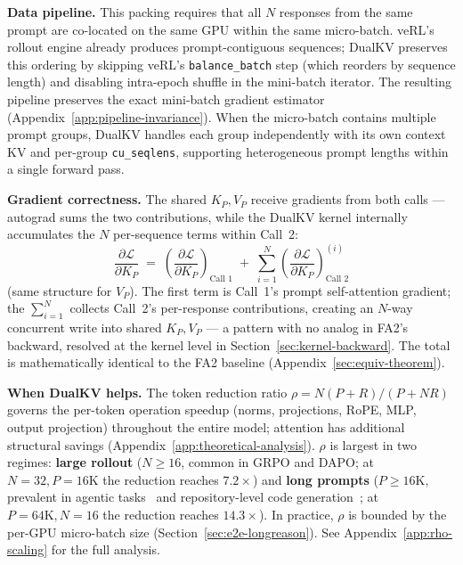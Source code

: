 \documentclass{article}
\begin{document}
\textbf{Data pipeline.} This packing requires that all $N$ responses from the same prompt are co-located on the same GPU within the same micro-batch. veRL's rollout engine already produces prompt-contiguous sequences; DualKV preserves this ordering by skipping veRL's \texttt{balance\_batch} step (which reorders by sequence length) and disabling intra-epoch shuffle in the mini-batch iterator. The resulting pipeline preserves the exact mini-batch gradient estimator (Appendix~\ref{app:pipeline-invariance}). When the micro-batch contains multiple prompt groups, DualKV handles each group independently with its own context KV and per-group \texttt{cu\_seqlens}, supporting heterogeneous prompt lengths within a single forward pass.

\textbf{Gradient correctness.} The shared $K_P, V_P$ receive gradients from both calls --- autograd sums the two contributions, while the DualKV kernel internally accumulates the $N$ per-sequence terms within Call~2:
\begin{equation}
  \frac{\partial \mathcal{L}}{\partial K_P} \;=\; \left(\frac{\partial \mathcal{L}}{\partial K_P}\right)_{\!\text{Call 1}} \;+\; \sum_{i=1}^{N} \left(\frac{\partial \mathcal{L}}{\partial K_P}\right)^{(i)}_{\!\text{Call 2}}
  \label{eq:dkp-accumulation}
\end{equation}
(same structure for $V_P$). The first term is Call~1's prompt self-attention gradient; the $\sum_{i=1}^{N}$ collects Call~2's per-response contributions, creating an $N$-way concurrent write into shared $K_P, V_P$ --- a pattern with no analog in FA2's backward, resolved at the kernel level in Section~\ref{sec:kernel-backward}. The total is mathematically identical to the FA2 baseline (Appendix~\ref{sec:equiv-theorem}).

\textbf{When DualKV helps.} The token reduction ratio $\rho = N(P+R)/(P+NR)$ governs the per-token operation speedup (norms, projections, RoPE, MLP, output projection) throughout the entire model; attention has additional structural savings (Appendix~\ref{app:theoretical-analysis}). $\rho$ is largest in two regimes: \textbf{large rollout} ($N \geq 16$, common in GRPO and DAPO; at $N{=}32, P{=}16\text{K}$ the reduction reaches $7.2\times$) and \textbf{long prompts} ($P \geq 16\text{K}$, prevalent in agentic tasks~\citep{jimenez2024swebench} and repository-level code generation~\citep{liu2023repobench}; at $P{=}64\text{K}, N{=}16$ the reduction reaches $14.3\times$). In practice, $\rho$ is bounded by the per-GPU micro-batch size (Section~\ref{sec:e2e-longreason}). See Appendix~\ref{app:rho-scaling} for the full analysis.
\end{document}
